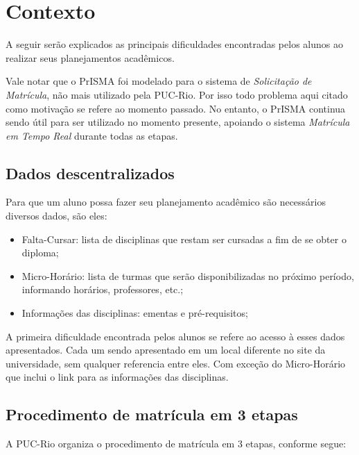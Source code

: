 \documentclass[graduacao,brazil]{ThesisPUC}
\begin{document}

\chapter{Contexto} %

A seguir serão explicados as principais dificuldades encontradas pelos alunos ao realizar seus planejamentos acadêmicos. 

Vale notar que o PrISMA foi modelado para o sistema de \textit{Solicitação de Matrícula}, não mais utilizado pela PUC-Rio. Por isso todo problema aqui citado como motivação se refere ao momento passado. No entanto, o PrISMA continua sendo útil para ser utilizado no momento presente, apoiando o sistema \textit{Matrícula em Tempo Real} durante todas as etapas.

\section{Dados descentralizados}

Para que um aluno possa fazer seu planejamento acadêmico são necessários diversos dados, são eles:

\begin{itemize}
	\item Falta-Cursar: lista de disciplinas que restam ser cursadas a fim de se obter o diploma;
	\item Micro-Horário: lista de turmas que serão disponibilizadas no próximo período, informando horários, professores, etc.;
	\item Informações das disciplinas: ementas e pré-requisitos;
\end{itemize}

A primeira dificuldade encontrada pelos alunos se refere ao acesso à esses dados apresentados. Cada um sendo apresentado em um local diferente no site da universidade, sem qualquer referencia entre eles. Com exceção do Micro-Horário que inclui o link para as informações das disciplinas.

\section{Procedimento de matrícula em 3 etapas}

A PUC-Rio organiza o procedimento de matrícula em 3 etapas, conforme segue:
\end{document}
